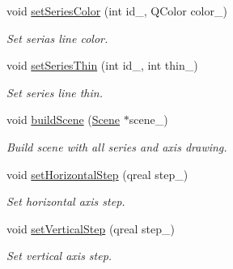 \begin{DoxyCompactItemize}
\mbox{\label{classeven_1_1_chart_easy_a2482342197315a2de557296a06a58a5f}} 
void \mbox{\hyperlink{classeven_1_1_chart_easy_a2482342197315a2de557296a06a58a5f}{set\+Series\+Color}} (int id\+\_\+, Q\+Color color\+\_\+)
\begin{DoxyCompactList}\small\item\em Set serias line color. \end{DoxyCompactList}\item 
\mbox{\label{classeven_1_1_chart_easy_a786c044da362faaf2e9c3af4ad9fc4e0}} 
void \mbox{\hyperlink{classeven_1_1_chart_easy_a786c044da362faaf2e9c3af4ad9fc4e0}{set\+Series\+Thin}} (int id\+\_\+, int thin\+\_\+)
\begin{DoxyCompactList}\small\item\em Set series line thin. \end{DoxyCompactList}\item 
\mbox{\label{classeven_1_1_chart_easy_a48dfc92c6fc175155986b7563d375583}} 
void \mbox{\hyperlink{classeven_1_1_chart_easy_a48dfc92c6fc175155986b7563d375583}{build\+Scene}} (\mbox{\hyperlink{classeven_1_1_scene}{Scene}} $\ast$scene\+\_\+)
\begin{DoxyCompactList}\small\item\em Build scene with all series and axis drawing. \end{DoxyCompactList}\item 
\mbox{\label{classeven_1_1_chart_easy_af4bde14a8bd28468a4ae0fda99dadf73}} 
void \mbox{\hyperlink{classeven_1_1_chart_easy_af4bde14a8bd28468a4ae0fda99dadf73}{set\+Horizontal\+Step}} (qreal step\+\_\+)
\begin{DoxyCompactList}\small\item\em Set horizontal axis step. \end{DoxyCompactList}\item 
\mbox{\label{classeven_1_1_chart_easy_a45fb598e58dba8cd72f6448b3f851a9e}} 
void \mbox{\hyperlink{classeven_1_1_chart_easy_a45fb598e58dba8cd72f6448b3f851a9e}{set\+Vertical\+Step}} (qreal step\+\_\+)
\begin{DoxyCompactList}\small\item\em Set vertical axis step. \end{DoxyCompactList}\end{DoxyCompactItemize}


